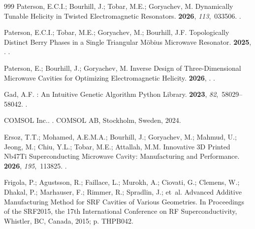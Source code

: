 \documentclass[
  aps,
  physrev,
  reprint,
  superscriptaddress,
  nofootinbib,
  amsmath,
  amssymb
]{revtex4-2}
\begin{document}
\begin{thebibliography}{999}
Paterson, E.C.I.; Bourhill, J.; Tobar, M.E.; Goryachev, M.
\newblock Dynamically Tunable Helicity in Twisted Electromagnetic Resonators.
 {\bf 2026}, {\em 113},~033506.
.

Paterson, E.C.I.; Tobar, M.E.; Goryachev, M.; Bourhill, J.F.
\newblock Topologically Distinct Berry Phases in a Single Triangular {M\"obius}
  Microwave Resonator.
 {\bf 2025},
  \href{http://arxiv.org/abs/2506.07320}{{}}.
.

Paterson, E.; Bourhill, J.; Goryachev, M.
\newblock Inverse Design of Three-Dimensional Microwave Cavities for Optimizing
  Electromagnetic Helicity.
 {\bf 2026},
  \href{http://arxiv.org/abs/2602.09037}{{}}.
.

Gad, A.F.
: An Intuitive Genetic Algorithm Python Library.
 {\bf 2023}, {\em
  82},~58029--58042.
.

{COMSOL Inc.}.
.
\newblock COMSOL AB, Stockholm, Sweden,  2024.

Ersoz, T.T.; Mohamed, A.E.M.A.; Bourhill, J.; Goryachev, M.; Mahmud, U.; Jeong,
  M.; Chiu, Y.L.; Tobar, M.E.; Attallah, M.M.
\newblock Innovative {3D} Printed {Nb47Ti} Superconducting Microwave Cavity:
  Manufacturing and Performance.
 {\bf 2026}, {\em 195},~113825.
.

Frigola, P.; Agustsson, R.; Faillace, L.; Murokh, A.; Ciovati, G.; Clemens, W.;
  Dhakal, P.; Marhauser, F.; Rimmer, R.; Spradlin, J.;  et~al.
\newblock Advanced Additive Manufacturing Method for {SRF} Cavities of Various
  Geometries.
\newblock In Proceedings of the {SRF2015}, the 17th
  International Conference on {RF} Superconductivity, Whistler, BC, Canada,
  2015; p. THPB042.


\end{thebibliography}
\end{document}
